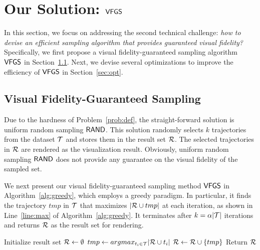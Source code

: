 \section{Our Solution: $\mathsf{VFGS}$}\label{sec:sol}
In this section, we focus on addressing the second technical challenge: \emph{how to devise an efficient sampling algorithm that provides guaranteed visual fidelity?}
Specifically, we first propose a visual fidelity-guaranteed sampling algorithm $\mathsf{VFGS}$ in Section~\ref{sec:greedy}. Next, we devise several optimizations to improve the efficiency of $\mathsf{VFGS}$ in Section~\ref{sec:opt}.

\subsection{Visual Fidelity-Guaranteed Sampling}\label{sec:greedy}
Due to the hardness of Problem~\ref{prob:def}, the straight-forward solution is uniform random sampling $\mathsf{RAND}$.
This solution randomly selects $k$ trajectories from the dataset $\mathcal{T}$ and stores them in the result set $\mathcal{R}$. The selected trajectories in $\mathcal{R}$ are rendered as the visualization result.
Obviously, uniform random sampling $\mathsf{RAND}$ does not provide any guarantee on the visual fidelity of the sampled set.

We next present our visual fidelity-guaranteed sampling method $\mathsf{VFGS}$ in Algorithm~\ref{alg:greedy}, which employs a greedy paradigm.
In particular, it finds the trajectory $tmp$ in $\mathcal{T}$ that maximizes $|\mathcal{R} \cup tmp|$ at each iteration, as shown in Line~\ref{line:max} of Algorithm~\ref{alg:greedy}.
It terminates after $k=\alpha |\mathcal{T}|$ iterations and returns $\mathcal{R}$ as the result set for rendering.

\begin{algorithm}
    \caption{$\vats(\D,k=\alpha |\D|)$} \label{alg:greedy}
    \begin{algorithmic}[1]
    \State Initialize result set $\mathcal{R} \leftarrow \emptyset$
        \State $tmp \leftarrow argmax_{t_i \in \mathcal{T}} |\mathcal{R} \cup t_i|$ \label{line:max}
        \State $\mathcal{R} \leftarrow \mathcal{R} \cup \{ tmp \}$
    \EndWhile
    \State Return $\mathcal{R}$
    \end{algorithmic}
\end{algorithm}


